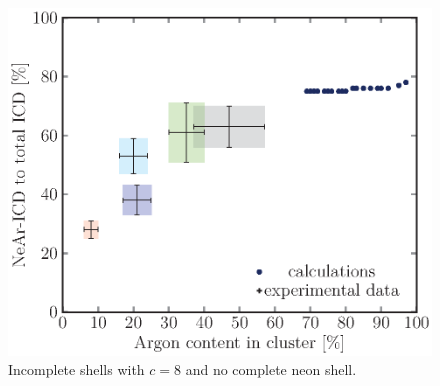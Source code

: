\begin{figure}[!h]
\begin{minipage}{0.48\textwidth}
    \centering
    \includegraphics[scale=0.5]{pics/incompl00_08.ps}
    \caption{Incomplete shells with $c=8$ and no complete neon shell.}
    \label{incompl00_08}
\end{minipage}
\hfill
\begin{minipage}{0.48\textwidth}
    \centering
\end{minipage}
\end{figure}

\FloatBarrier

